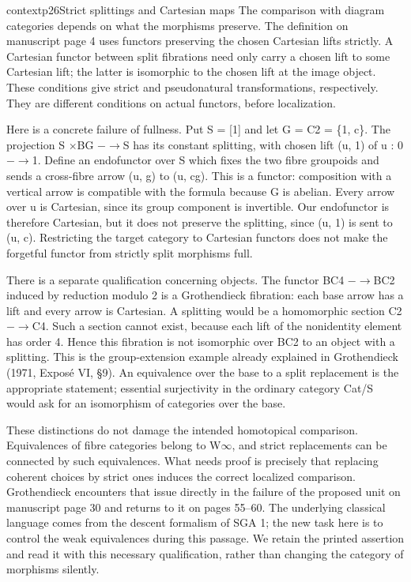 \begin{dcomment}{context}{p26}{Strict splittings and Cartesian maps}
The comparison with diagram categories depends on what the morphisms preserve. The definition on manuscript page 4 uses functors preserving the chosen Cartesian lifts strictly. A Cartesian functor between split fibrations need only carry a chosen lift to some Cartesian lift; the latter is isomorphic to the chosen lift at the image object. These conditions give strict and pseudonatural transformations, respectively. They are different conditions on actual functors, before localization.

Here is a concrete failure of fullness. Put S = [1] and let G = C2 = \{1, c\}. The projection S \ensuremath{\times}BG \ensuremath{-}\ensuremath{\to}S has its constant splitting, with chosen lift (u, 1) of u : 0 \ensuremath{-}\ensuremath{\to}1. Define an endofunctor over S which fixes the two fibre groupoids and sends a cross-fibre arrow (u, g) to (u, cg). This is a functor: composition with a vertical arrow is compatible with the formula because G is abelian. Every arrow over u is Cartesian, since its group component is invertible. Our endofunctor is therefore Cartesian, but it does not preserve the splitting, since (u, 1) is sent to (u, c). Restricting the target category to Cartesian functors does not make the forgetful functor from strictly split morphisms full.

There is a separate qualification concerning objects. The functor BC4 \ensuremath{-}\ensuremath{\to}BC2 induced by reduction modulo 2 is a Grothendieck fibration: each base arrow has a lift and every arrow is Cartesian. A splitting would be a homomorphic section C2 \ensuremath{-}\ensuremath{\to}C4. Such a section cannot exist, because each lift of the nonidentity element has order 4. Hence this fibration is not isomorphic over BC2 to an object with a splitting. This is the group-extension example already explained in Grothendieck (1971, Exposé VI, \S{}9). An equivalence over the base to a split replacement is the appropriate statement; essential surjectivity in the ordinary category Cat/S would ask for an isomorphism of categories over the base.

These distinctions do not damage the intended homotopical comparison. Equivalences of fibre categories belong to W\ensuremath{\infty}, and strict replacements can be connected by such equivalences. What needs proof is precisely that replacing coherent choices by strict ones induces the correct localized comparison. Grothendieck encounters that issue directly in the failure of the proposed unit on manuscript page 30 and returns to it on pages 55--60. The underlying classical language comes from the descent formalism of SGA 1; the new task here is to control the weak equivalences during this passage. We retain the printed assertion and read it with this necessary qualification, rather than changing the category of morphisms silently.

\end{dcomment}

